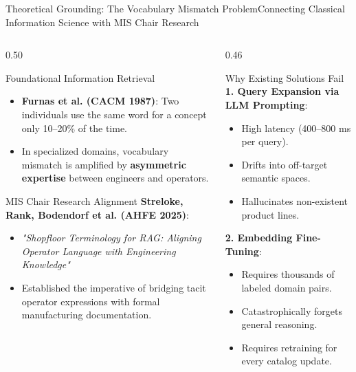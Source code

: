 \documentclass[aspectratio=169,10pt]{beamer}
\begin{document}
\begin{frame}{Theoretical Grounding: The Vocabulary Mismatch Problem}{Connecting Classical Information Science with MIS Chair Research}
  \begin{columns}[T]
    \begin{column}{0.50\textwidth}
      \begin{block}{Foundational Information Retrieval}
        \scriptsize
        \begin{itemize}\setlength\itemsep{0.1ex}
          \item \textbf{Furnas et al. (CACM 1987)}: Two individuals use the same word for a concept only 10--20\% of the time.
          \item In specialized domains, vocabulary mismatch is amplified by \textbf{asymmetric expertise} between engineers and operators.
        \end{itemize}
      \end{block}

      \begin{exampleblock}{MIS Chair Research Alignment}
        \scriptsize
        \textbf{Streloke, Rank, Bodendorf et al. (AHFE 2025)}:
        \begin{itemize}\setlength\itemsep{0.1ex}
          \item \textit{"Shopfloor Terminology for RAG: Aligning Operator Language with Engineering Knowledge"}
          \item Established the imperative of bridging tacit operator expressions with formal manufacturing documentation.
        \end{itemize}
      \end{exampleblock}
    \end{column}

    \begin{column}{0.46\textwidth}
      \begin{block}{Why Existing Solutions Fail}
        \scriptsize
        \textbf{1. Query Expansion via LLM Prompting}:
        \begin{itemize}\setlength\itemsep{0.03ex}
          \item High latency (400--800 ms per query).
          \item Drifts into off-target semantic spaces.
          \item Hallucinates non-existent product lines.
        \end{itemize}
        \textbf{2. Embedding Fine-Tuning}:
        \begin{itemize}\setlength\itemsep{0.03ex}
          \item Requires thousands of labeled domain pairs.
          \item Catastrophically forgets general reasoning.
          \item Requires retraining for every catalog update.
        \end{itemize}
      \end{block}


\end{column}
\end{columns}
\end{frame}
\end{document}
